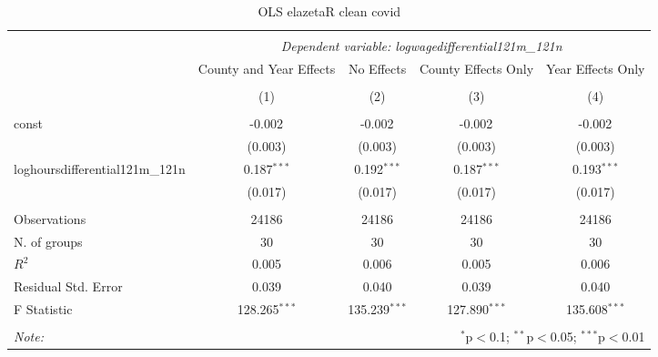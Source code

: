 \documentclass{report}
\begin{document}
\begin{table}[!htbp] \centering
  \caption{OLS elazetaR  clean covid}
\begin{tabular}{@{\extracolsep{5pt}}lcccc}
\\[-1.8ex]\hline
\hline \\[-1.8ex]
& \multicolumn{4}{c}{\textit{Dependent variable: logwagedifferential121m_121n}} \
\cr \cline{2-5}
\\[-1.8ex] & \multicolumn{1}{c}{County and Year Effects} & \multicolumn{1}{c}{No Effects} & \multicolumn{1}{c}{County Effects Only} & \multicolumn{1}{c}{Year Effects Only}  \\
\\[-1.8ex] & (1) & (2) & (3) & (4) \\
\hline \\[-1.8ex]
 const & -0.002$^{}$ & -0.002$^{}$ & -0.002$^{}$ & -0.002$^{}$ \\
& (0.003) & (0.003) & (0.003) & (0.003) \\
 loghoursdifferential121m_121n & 0.187$^{***}$ & 0.192$^{***}$ & 0.187$^{***}$ & 0.193$^{***}$ \\
& (0.017) & (0.017) & (0.017) & (0.017) \\
\hline \\[-1.8ex]
 Observations & 24186 & 24186 & 24186 & 24186 \\
 N. of groups & 30 & 30 & 30 & 30 \\
 $R^2$ & 0.005 & 0.006 & 0.005 & 0.006 \\
 Residual Std. Error & 0.039 & 0.040 & 0.039 & 0.040 \\
 F Statistic & 128.265$^{***}$ & 135.239$^{***}$ & 127.890$^{***}$ & 135.608$^{***}$ \\
\hline
\hline \\[-1.8ex]
\textit{Note:} & \multicolumn{4}{r}{$^{*}$p$<$0.1; $^{**}$p$<$0.05; $^{***}$p$<$0.01} \\
\end{tabular}
\end{table}
\end{document}
